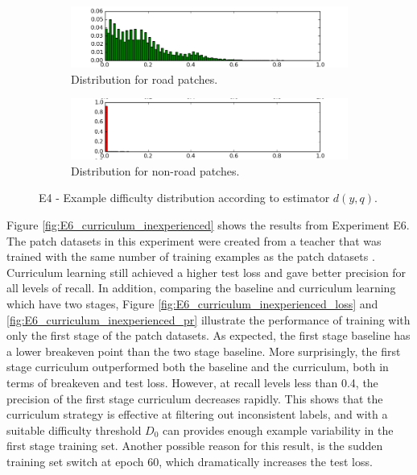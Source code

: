 \begin{figure}
\begin{subfigure}{0.5\textwidth}
\includegraphics[width=\linewidth]{figs/E2/E2-road-dist.png}
\caption{Distribution for road patches.} \label{fig:E4_difficulty_distribution_road}
\end{subfigure}
\hspace*{\fill} %
\begin{subfigure}{0.5\textwidth}
\includegraphics[width=\linewidth]{figs/E2/E2-non_road-dist.png}
\caption{Distribution for non-road patches.} \label{fig:E4_difficulty_distribution_nonroad}
\end{subfigure}
\hspace*{\fill} %
\caption[E4 - Difficulty distribution]{E4 - Example difficulty distribution according to estimator $d(y,q)$. } \label{fig:E4_difficulty_distribution}
\end{figure}

Figure \ref{fig:E6_curriculum_inexperienced} shows the results from Experiment E6. The patch datasets in this experiment were created from a teacher that was trained with the same number of training examples as the patch datasets . Curriculum learning still achieved a higher test loss and gave better precision for all levels of recall. In addition, comparing the baseline and curriculum learning which have two stages, Figure \ref{fig:E6_curriculum_inexperienced_loss} and \ref{fig:E6_curriculum_inexperienced_pr} illustrate the performance of training with only the first stage of the patch datasets. As expected, the first stage baseline has a lower breakeven point than the two stage baseline. More surprisingly, the first stage curriculum outperformed both the baseline and the curriculum, both in terms of breakeven and test loss. However, at recall levels less than 0.4, the precision of the first stage curriculum decreases rapidly. This shows that the curriculum strategy is effective at filtering out inconsistent labels, and with a suitable difficulty threshold $D_0$ can provides enough example variability in the first stage training set. Another possible reason for this result, is the sudden training set switch at epoch 60, which dramatically increases the test loss. \\

